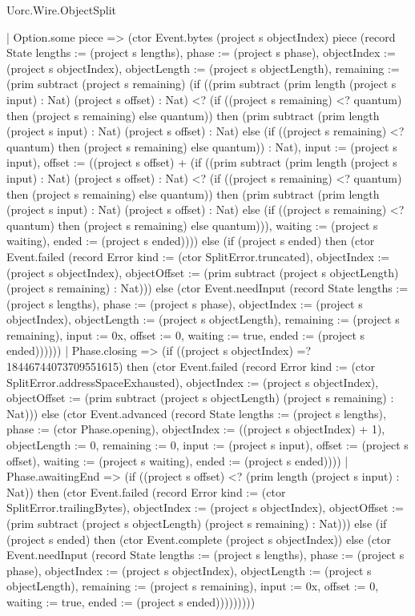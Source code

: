 \begin{lexlean}{Uorc.Wire.ObjectSplit}
\begin{semanticmodule}
{      | Option.some piece => (ctor Event.bytes (project s objectIndex) piece (record State {lengths := (project s lengths), phase := (project s phase), objectIndex := (project s objectIndex), objectLength := (project s objectLength), remaining := (prim subtract (project s remaining) (if ((prim subtract (prim length (project s input) : Nat) (project s offset) : Nat) <? (if ((project s remaining) <? quantum) then (project s remaining) else quantum)) then (prim subtract (prim length (project s input) : Nat) (project s offset) : Nat) else (if ((project s remaining) <? quantum) then (project s remaining) else quantum)) : Nat), input := (project s input), offset := ((project s offset) + (if ((prim subtract (prim length (project s input) : Nat) (project s offset) : Nat) <? (if ((project s remaining) <? quantum) then (project s remaining) else quantum)) then (prim subtract (prim length (project s input) : Nat) (project s offset) : Nat) else (if ((project s remaining) <? quantum) then (project s remaining) else quantum))), waiting := (project s waiting), ended := (project s ended)}))) else (if (project s ended) then (ctor Event.failed (record Error {kind := (ctor SplitError.truncated), objectIndex := (project s objectIndex), objectOffset := (prim subtract (project s objectLength) (project s remaining) : Nat)})) else (ctor Event.needInput (record State {lengths := (project s lengths), phase := (project s phase), objectIndex := (project s objectIndex), objectLength := (project s objectLength), remaining := (project s remaining), input := 0x, offset := 0, waiting := true, ended := (project s ended)})))))
    | Phase.closing => (if ((project s objectIndex) =? 18446744073709551615) then (ctor Event.failed (record Error {kind := (ctor SplitError.addressSpaceExhausted), objectIndex := (project s objectIndex), objectOffset := (prim subtract (project s objectLength) (project s remaining) : Nat)})) else (ctor Event.advanced (record State {lengths := (project s lengths), phase := (ctor Phase.opening), objectIndex := ((project s objectIndex) + 1), objectLength := 0, remaining := 0, input := (project s input), offset := (project s offset), waiting := (project s waiting), ended := (project s ended)})))
    | Phase.awaitingEnd => (if ((project s offset) <? (prim length (project s input) : Nat)) then (ctor Event.failed (record Error {kind := (ctor SplitError.trailingBytes), objectIndex := (project s objectIndex), objectOffset := (prim subtract (project s objectLength) (project s remaining) : Nat)})) else (if (project s ended) then (ctor Event.complete (project s objectIndex)) else (ctor Event.needInput (record State {lengths := (project s lengths), phase := (project s phase), objectIndex := (project s objectIndex), objectLength := (project s objectLength), remaining := (project s remaining), input := 0x, offset := 0, waiting := true, ended := (project s ended)}))))))))
}


\end{semanticmodule}
\end{lexlean}
